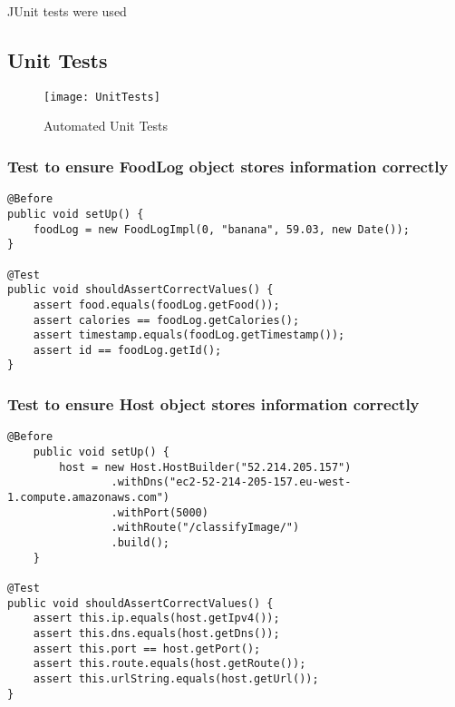 JUnit tests were used 

\subsection*{Unit Tests}

\begin{figure}[h]
    \texttt{[image: UnitTests]}
    \caption{Automated Unit Tests}
    \label{fig:unitTests}
\end{figure}

\subsubsection*{Test to ensure FoodLog object stores information correctly}
\begin{lstlisting}[style=Java]
@Before
public void setUp() {
    foodLog = new FoodLogImpl(0, "banana", 59.03, new Date());
}

@Test
public void shouldAssertCorrectValues() {
    assert food.equals(foodLog.getFood());
    assert calories == foodLog.getCalories();
    assert timestamp.equals(foodLog.getTimestamp());
    assert id == foodLog.getId();
}
\end{lstlisting}

\subsubsection*{Test to ensure Host object stores information correctly}
\begin{lstlisting}[style=Java]
@Before
    public void setUp() {
        host = new Host.HostBuilder("52.214.205.157")
                .withDns("ec2-52-214-205-157.eu-west-1.compute.amazonaws.com")
                .withPort(5000)
                .withRoute("/classifyImage/")
                .build();
    }

@Test
public void shouldAssertCorrectValues() {
    assert this.ip.equals(host.getIpv4());
    assert this.dns.equals(host.getDns());
    assert this.port == host.getPort();
    assert this.route.equals(host.getRoute());
    assert this.urlString.equals(host.getUrl());
}
\end{lstlisting}

